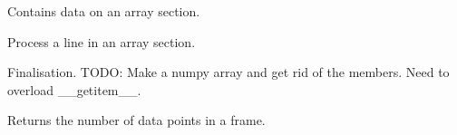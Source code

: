 \documentclass[letterpaper,10pt,english]{sphinxmanual}
\begin{document}

\begin{fulllineitems}
\label{\detokenize{ref/LAS/core/LASRead:TotalDepth.LAS.core.LASRead.LASSectionArray}}
Contains data on an array section.

\begin{fulllineitems}
\label{\detokenize{ref/LAS/core/LASRead:TotalDepth.LAS.core.LASRead.LASSectionArray.addMemberLine}}
Process a line in an array section.

\end{fulllineitems}


\begin{fulllineitems}
\label{\detokenize{ref/LAS/core/LASRead:TotalDepth.LAS.core.LASRead.LASSectionArray.finalise}}
Finalisation.
TODO: Make a numpy array and get rid of the members. Need to overload \_\_getitem\_\_.

\end{fulllineitems}


\begin{fulllineitems}
\label{\detokenize{ref/LAS/core/LASRead:TotalDepth.LAS.core.LASRead.LASSectionArray.frameSize}}
Returns the number of data points in a frame.

\end{fulllineitems}


\end{fulllineitems}

\end{document}
